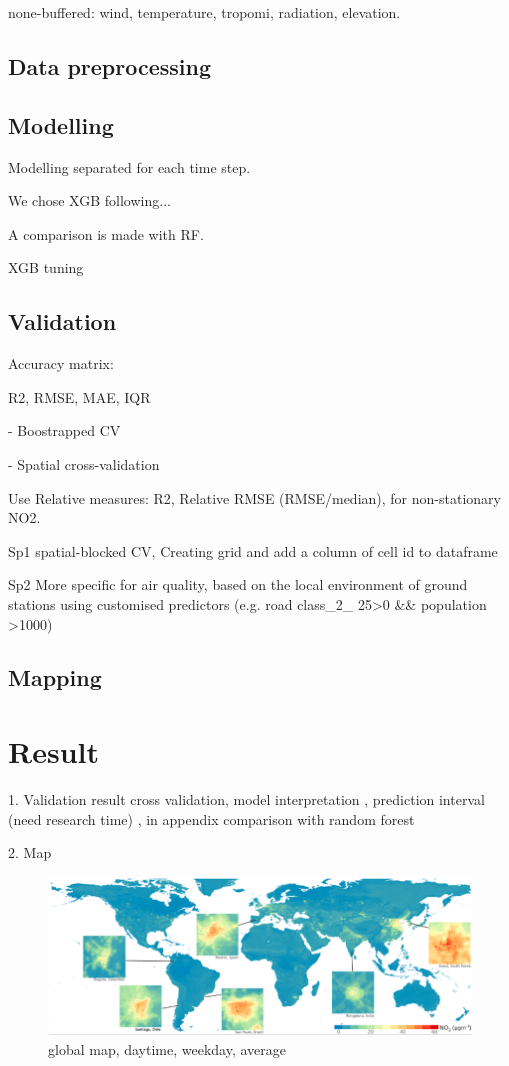 \documentclass{article}
\begin{document}
none-buffered: wind, temperature, tropomi, radiation, elevation.

\subsection{Data preprocessing}

\subsection{Modelling}
Modelling separated for each time step.

We chose XGB following...

A comparison is made with RF. 

XGB tuning

\subsection{Validation}

Accuracy matrix:

R2, RMSE, MAE, IQR

- Boostrapped CV

- Spatial cross-validation

Use Relative measures: 
R2, Relative RMSE (RMSE/median), for non-stationary NO2. 


Sp1 spatial-blocked CV,
Creating grid and add a column of cell id to dataframe 


Sp2 More specific for air quality, based on the local environment of ground stations using customised predictors (e.g. road class\_2\_ 25>0 \&\& population >1000)



\subsection{Mapping} 

\section{Result}
1. Validation result
cross validation, model interpretation 
                   , prediction interval (need research time) 					, in appendix comparison with random forest
                   
2. Map
\begin{figure}
    \centering
    \includegraphics[width=\textwidth]{fig/glomap.png}
    \caption{global map, daytime, weekday, average}
    \label{fig:map}
\end{figure}
\end{document}
